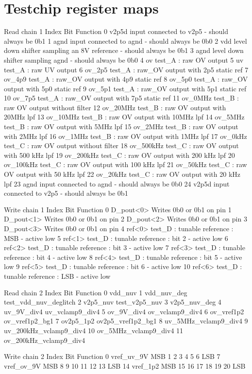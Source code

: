 \chapter{Testchip register maps}
\label{apx:testchip-register-maps}

Read chain 1
Index	Bit	Function
0	v2p5d	input connected to v2p5 - should always be 0b1
1	agnd	input connected to agnd - should always be 0b0
2	vdd	level down shifter sampling an 8V reference - should always be 0b1
3	agnd	level down shifter sampling agnd - should always be 0b0
4	ov	test_A : raw OV output
5	uv	test_A : raw UV output
6	ov_2p5	test_A : raw_OV output with 2p5 static ref
7	ov_4p9	test_A : raw_OV output with 4p9 static ref
8	ov_5p0	test_A : raw_OV output with 5p0 static ref
9	ov_5p1	test_A : raw_OV output with 5p1 static ref
10	ov_7p5	test_A : raw_OV output with 7p5 static ref
11	ov_0MHz	test_B : raw OV output without filter
12	ov_20MHz	test_B : raw OV output with 20MHz lpf
13	ov_10MHz	test_B : raw OV output with 10MHz lpf
14	ov_5MHz	test_B : raw OV output with 5MHz lpf
15	ov_2MHz	test_B : raw OV output with 2MHz lpf
16	ov_1MHz	test_B : raw OV output with 1MHz lpf
17	ov_0kHz	test_C : raw OV output without filter
18	ov_500kHz	test_C : raw OV output with 500 kHz lpf
19	ov_200kHz	test_C : raw OV output with 200 kHz lpf
20	ov_100kHz	test_C : raw OV output with 100 kHz lpf
21	ov_50kHz	test_C : raw OV output with 50 kHz lpf
22	ov_20kHz	test_C : raw OV output with 20 kHz lpf
23	agnd	input connected to agnd - should always be 0b0
24	v2p5d	input connected to v2p5 - should always be 0b1


Write chain 1
Index	Bit	Function
0	D_pout<0>	Writes 0b0 or 0b1 on pin
1	D_pout<1>	Writes 0b0 or 0b1 on pin
2	D_pout<2>	Writes 0b0 or 0b1 on pin
3	D_pout<3>	Writes 0b0 or 0b1 on pin
4	ref<0>	test_D : tunable reference : MSB - active low
5	ref<1>	test_D : tunable reference : bit 2 - active low
6	ref<2>	test_D : tunable reference : bit 3 - active low
7	ref<3>	test_D : tunable reference : bit 4 - active low
8	ref<4>	test_D : tunable reference : bit 5 - active low
9	ref<5>	test_D : tunable reference : bit 6 - active low
10	ref<6>	test_D : tunable reference : LSB - active low


Read chain 2
Index	Bit	Function
0	vdd_nuv
1	vdd_nuv_deg	test_vdd_nuv_deglitch
2	v2p5_nuv	test_v2p5_nuv
3	v2p5_nuv_deg
4	uv_9V_div4	uv_vclamp9_div4
5	ov_9V_div4	ov_vclamp9_div4
6	ov_vref1p2	ov_vref1p2_bg1
7	ov2p5_1p2	ov2p5_vref1p2_bg1
8		uv_5MHz_vclamp9_div4
9		uv_200kHz_vclamp9_div4
10		ov_5MHz_vclamp9_div4
11		ov_200kHz_vclamp9_div4


Write chain 2
Index	Bit	Function
0	vref_uv_9V	MSB
1
2
3
4
5
6		LSB
7	vref_ov_9V	MSB
8
9
10
11
12
13		LSB
14	vref_1p2	MSB
15
16
17
18
19
20		LSB
